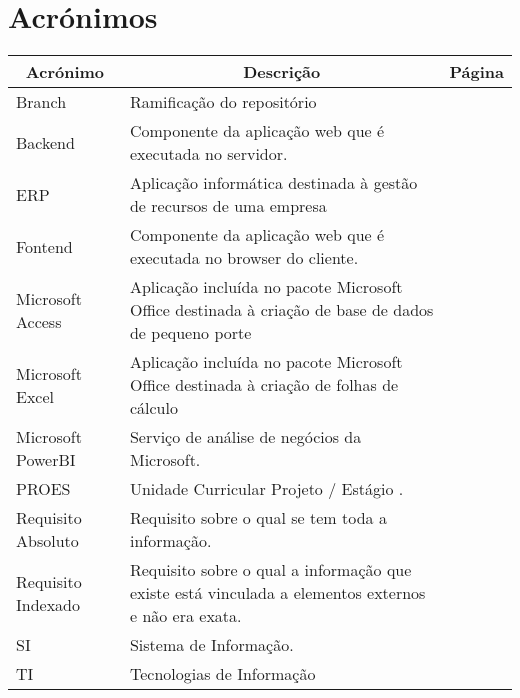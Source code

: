 

\chapter[Acrónimos]{Acrónimos}

\begin{center}
\small
\begin{longtable}{lp{3.0in}c}
\toprule \multicolumn{1}{c}{Acrónimo}
                & \multicolumn{1}{c}{Descrição}
                                & \multicolumn{1}{c}{Página}\\ \midrule\addlinespace[2pt] \endhead

\bottomrule\endfoot




Branch
    & Ramificação do repositório
    & \pageref{sym:BRANCH}\\
Backend
    & Componente da aplicação web que é executada no servidor.
    & \pageref{sym:BACKEND}\\
ERP
    & Aplicação informática destinada à gestão de recursos de uma empresa
    & \pageref{sym:ERP}\\
Fontend
    & Componente da aplicação web que é executada no browser do cliente.
    & \pageref{sym:FRONTEND}\\
Microsoft Access
    & Aplicação incluída no pacote Microsoft Office destinada à criação de base de dados de pequeno porte
    & \pageref{sym:MS_ACCESS}\\
Microsoft Excel
    & Aplicação incluída no pacote Microsoft Office destinada à criação de folhas de cálculo
    & \pageref{sym:MS_EXCEL}\\
Microsoft PowerBI
    & Serviço de análise de negócios da Microsoft.
    & \pageref{sym:MS_POWERBI}\\
PROES
    & Unidade Curricular Projeto / Estágio .
    & \pageref{sym:PROES}\\
Requisito Absoluto
    & Requisito sobre o qual se tem toda a informação.
    & \pageref{sym:REQUISITO_ABSOLUTO}\\
Requisito Indexado
    & Requisito sobre o qual a informação que existe está vinculada a elementos externos e não era exata.
    & \pageref{sym:REQUISITO_INDEXADO}\\
SI
    & Sistema de Informação.
    & \pageref{sym:SI}\\
TI
    & Tecnologias de Informação
    & \pageref{sym:TI}\\




\end{longtable}

\end{center}

